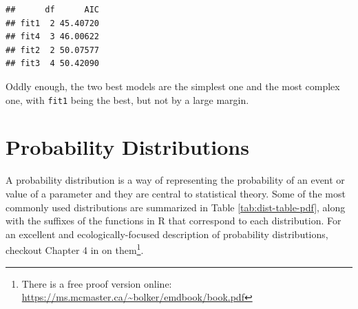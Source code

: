 \documentclass[]{book}
\newenvironment{Shaded}{\begin{snugshade}}{\end{snugshade}}
\newcommand{\KeywordTok}[1]{\textcolor[rgb]{0.13,0.29,0.53}{\textbf{#1}}}
\newcommand{\StringTok}[1]{\textcolor[rgb]{0.31,0.60,0.02}{#1}}
\newcommand{\OperatorTok}[1]{\textcolor[rgb]{0.81,0.36,0.00}{\textbf{#1}}}
\newcommand{\NormalTok}[1]{#1}
\let\rmarkdownfootnote\footnote%
\def\footnote{\protect\rmarkdownfootnote}
\theoremstyle{definition}
\theoremstyle{definition}
\theoremstyle{definition}
\theoremstyle{remark}
\begin{document}
\begin{Shaded}
\end{Shaded}

\begin{verbatim}
##      df      AIC
## fit1  2 45.40720
## fit4  3 46.00622
## fit2  2 50.07577
## fit3  4 50.42090
\end{verbatim}

Oddly enough, the two best models are the simplest one and the most
complex one, with \texttt{fit1} being the best, but not by a large
margin.

\section{Probability Distributions}\label{dists}

A probability distribution is a way of representing the probability of
an event or value of a parameter and they are central to statistical
theory. Some of the most commonly used distributions are summarized in
Table \ref{tab:dist-table-pdf}, along with the suffixes of the functions
in R that correspond to each distribution. For an excellent and
ecologically-focused description of probability distributions, checkout
Chapter 4 in \citet{emdbook-cite} on them\footnote{There is a free proof
  version online: \url{https://ms.mcmaster.ca/~bolker/emdbook/book.pdf}}.
\end{document}
